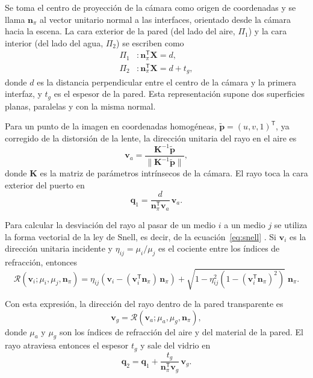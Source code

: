 Se toma el centro de proyección de la cámara como origen de coordenadas y se llama $\mathbf{n}_\pi$ al vector unitario normal a las interfaces, orientado desde la cámara hacia la escena. La cara exterior de la pared (del lado del aire, $\Pi_1$) y la cara interior (del lado del agua, $\Pi_2$) se escriben como \parencite{Agrawal2012,JordtSedlazeck2012}
\begin{align}
\Pi_1 &: \mathbf{n}_\pi^{\mathsf{T}}\mathbf{X} = d, \label{eq:pi1}\\
\Pi_2 &: \mathbf{n}_\pi^{\mathsf{T}}\mathbf{X} = d + t_g, \label{eq:pi2}
\end{align}
donde $d$ es la distancia perpendicular entre el centro de la cámara y la primera interfaz, y $t_g$ es el espesor de la pared. Esta representación supone dos superficies planas, paralelas y con la misma normal.

Para un punto de la imagen en coordenadas homogéneas, $\tilde{\mathbf{p}} = (u, v, 1)^{\mathsf{T}}$, ya corregido de la distorsión de la lente, la dirección unitaria del rayo en el aire es \parencite{Hartley2004}
\begin{equation}
\mathbf{v}_a = \frac{\mathbf{K}^{-1}\tilde{\mathbf{p}}}{\lVert \mathbf{K}^{-1}\tilde{\mathbf{p}} \rVert},
\label{eq:va}
\end{equation}
donde $\mathbf{K}$ es la matriz de parámetros intrínsecos de la cámara. El rayo toca la cara exterior del puerto en \parencite{Agrawal2012,JordtSedlazeck2012}
\begin{equation}
\mathbf{q}_1 = \frac{d}{\mathbf{n}_\pi^{\mathsf{T}}\mathbf{v}_a}\,\mathbf{v}_a .
\label{eq:q1}
\end{equation}

Para calcular la desviación del rayo al pasar de un medio $i$ a un medio $j$ se utiliza la forma vectorial de la ley de Snell, es decir, de la ecuación~\eqref{eq:snell} \parencite{Hecht2017,Agrawal2012}. Si $\mathbf{v}_i$ es la dirección unitaria incidente y $\eta_{ij} = \mu_i/\mu_j$ es el cociente entre los índices de refracción, entonces
\begin{equation}
\mathcal{R}(\mathbf{v}_i; \mu_i, \mu_j, \mathbf{n}_\pi) = \eta_{ij}\left(\mathbf{v}_i - (\mathbf{v}_i^{\mathsf{T}}\mathbf{n}_\pi)\,\mathbf{n}_\pi\right) + \sqrt{1 - \eta_{ij}^2\left(1 - (\mathbf{v}_i^{\mathsf{T}}\mathbf{n}_\pi)^2\right)}\;\mathbf{n}_\pi .
\label{eq:snell-vec}
\end{equation}

Con esta expresión, la dirección del rayo dentro de la pared transparente es \parencite{Agrawal2012,JordtSedlazeck2012}
\begin{equation}
\mathbf{v}_g = \mathcal{R}(\mathbf{v}_a; \mu_a, \mu_g, \mathbf{n}_\pi),
\label{eq:vg}
\end{equation}
donde $\mu_a$ y $\mu_g$ son los índices de refracción del aire y del material de la pared. El rayo atraviesa entonces el espesor $t_g$ y sale del vidrio en
\begin{equation}
\mathbf{q}_2 = \mathbf{q}_1 + \frac{t_g}{\mathbf{n}_\pi^{\mathsf{T}}\mathbf{v}_g}\,\mathbf{v}_g .
\label{eq:q2}
\end{equation}

